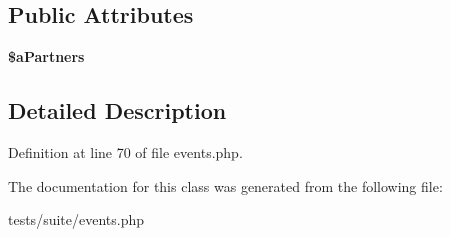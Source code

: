 \subsection*{Public Attributes}
\begin{DoxyCompactItemize}
\item 
\hypertarget{classclsMutuallyExclusiveButton_a67a07aba937ad258a3723456e493212f}{
{\bfseries \$aPartners}}
\label{classclsMutuallyExclusiveButton_a67a07aba937ad258a3723456e493212f}

\end{DoxyCompactItemize}


\subsection{Detailed Description}


Definition at line 70 of file events.php.



The documentation for this class was generated from the following file:\begin{DoxyCompactItemize}
\item 
tests/suite/events.php\end{DoxyCompactItemize}
